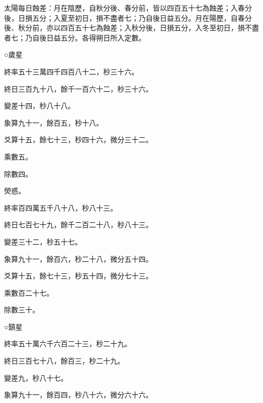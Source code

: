 \begin{pinyinscope}
 太陽每日蝕差：月在陰歷，自秋分後、春分前，皆以四百五十七為蝕差；入春分後，日損五分；入夏至初日，損不盡者七；乃自後日益五分。月在陽歷，自春分後、秋分前，亦以四百五十七為蝕差；入秋分後，日損五分，入冬至初日，損不盡者七；乃自後日益五分。各得朔日所入定數。



 ○歲星



 終率五十三萬四千四百八十二，秒三十六。



 終日三百九十八，餘千一百六十二，秒三十六。



 變差十四，秒八十八。



 象算九十一，餘百五，秒十八。



 爻算十五，餘七十三，秒四十六，微分三十二。



 乘數五。



 除數四。



 熒惑。



 終率百四萬五千八十八，秒八十三。



 終日七百七十九，餘千二百二十八，秒八十三。



 變差三十二，秒五十七。



 象算九十一，餘百六，秒二十八，微分五十四。



 爻算十五，餘七十三，秒五十四，微分七十三。



 乘數百二十七。



 除數三十。



 ○鎮星



 終率五十萬六千六百二十三，秒二十九。



 終日三百七十八，餘百三，秒二十九。



 變差九，秒八十七。



 象算九十一，餘百四，秒八十六，微分六十六。




\end{pinyinscope}
